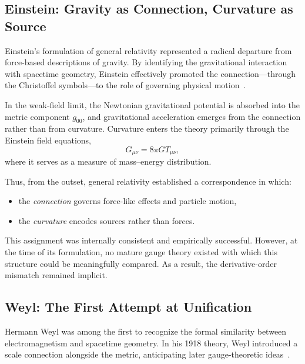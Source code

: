 \documentclass[12pt,letterpaper]{article}
\begin{document}
\subsection{Einstein: Gravity as Connection, Curvature as Source}

\justifying
Einstein's formulation of general relativity represented a radical departure from force-based descriptions of gravity. By identifying the gravitational interaction with spacetime geometry, Einstein effectively promoted the connection---through the Christoffel symbols---to the role of governing physical motion~\cite{Einstein1916}.

In the weak-field limit, the Newtonian gravitational potential is absorbed into the metric component $g_{00}$, and gravitational acceleration emerges from the connection rather than from curvature. Curvature enters the theory primarily through the Einstein field equations,
\begin{equation}
G_{\mu\nu} = 8\pi G T_{\mu\nu},
\end{equation}
where it serves as a measure of mass--energy distribution.

Thus, from the outset, general relativity established a correspondence in which:
\begin{itemize}
\item the \emph{connection} governs force-like effects and particle motion,
\item the \emph{curvature} encodes sources rather than forces.
\end{itemize}

This assignment was internally consistent and empirically successful. However, at the time of its formulation, no mature gauge theory existed with which this structure could be meaningfully compared. As a result, the derivative-order mismatch remained implicit.

\subsection{Weyl: The First Attempt at Unification}

\justifying
Hermann Weyl was among the first to recognize the formal similarity between electromagnetism and spacetime geometry. In his 1918 theory, Weyl introduced a scale connection alongside the metric, anticipating later gauge-theoretic ideas~\cite{Weyl1918}.
\end{document}
